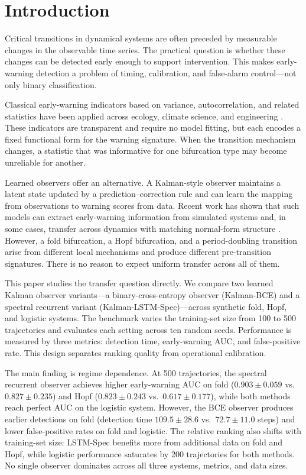 \section{Introduction}
\label{sec:introduction}

Critical transitions in dynamical systems are often preceded by measurable
changes in the observable time series. The practical question is whether
these changes can be detected early enough to support intervention. This
makes early-warning detection a problem of timing, calibration, and
false-alarm control---not only binary classification.

Classical early-warning indicators based on variance, autocorrelation, and
related statistics have been applied across ecology, climate science, and
engineering \citep{scheffer2009early,dakos2008slowing}. These indicators are
transparent and require no model fitting, but each encodes a fixed functional
form for the warning signature. When the transition mechanism changes, a
statistic that was informative for one bifurcation type may become unreliable
for another.

Learned observers offer an alternative. A Kalman-style observer maintains a
latent state updated by a prediction--correction rule and can learn the
mapping from observations to warning scores from data. Recent work has shown
that such models can extract early-warning information from simulated
systems and, in some cases, transfer across dynamics with matching
normal-form structure \citep{bury2021deep,deb2022machine}. However, a
fold bifurcation, a Hopf bifurcation, and a period-doubling transition
arise from different local mechanisms
\citep{kuznetsov2004elements,strogatz2015nonlinear} and produce different
pre-transition signatures. There is no reason to expect uniform transfer
across all of them.

This paper studies the transfer question directly. We compare two learned
Kalman observer variants---a binary-cross-entropy observer (Kalman-BCE) and
a spectral recurrent variant (Kalman-LSTM-Spec)---across synthetic fold,
Hopf, and logistic systems. The benchmark varies the training-set size from
100 to 500 trajectories and evaluates each setting across ten random seeds.
Performance is measured by three metrics: detection time, early-warning AUC,
and false-positive rate. This design separates ranking quality from
operational calibration.

The main finding is regime dependence. At 500 trajectories, the spectral
recurrent observer achieves higher early-warning AUC on fold
($0.903 \pm 0.059$ vs.\ $0.827 \pm 0.235$) and Hopf
($0.823 \pm 0.243$ vs.\ $0.617 \pm 0.177$), while both methods reach
perfect AUC on the logistic system. However, the BCE observer produces
earlier detections on fold (detection time $109.5 \pm 28.6$ vs.\
$72.7 \pm 11.0$ steps) and lower false-positive rates on fold and logistic.
The relative ranking also shifts with training-set size: LSTM-Spec benefits
more from additional data on fold and Hopf, while logistic performance
saturates by 200 trajectories for both methods. No single observer dominates
across all three systems, metrics, and data sizes.

